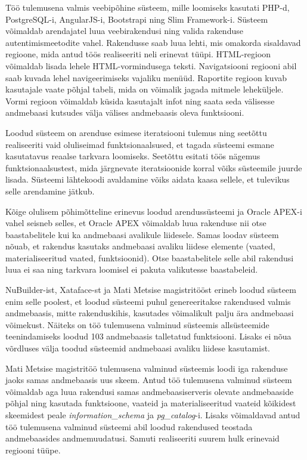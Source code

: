 \documentclass[a4paper,12pt]{article} %
\begin{document}
Töö tulemusena valmis veebipõhine süsteem, mille loomiseks kasutati PHP-d, PostgreSQL-i, AngularJS-i, Bootstrapi ning Slim Framework-i. Süsteem võimaldab arendajatel luua veebirakendusi ning valida rakenduse autentimismeetodite vahel. Rakendusse saab luua lehti, mis omakorda sisaldavad regioone, mida antud töös realiseeriti neli erinevat tüüpi. HTML-regioon võimaldab lisada lehele HTML-vormindusega teksti. Navigatsiooni regiooni abil saab kuvada lehel navigeerimiseks vajaliku menüüd. Raportite regioon kuvab kasutajale vaate põhjal tabeli, mida on võimalik jagada mitmele leheküljele. Vormi regioon võimaldab küsida kasutajalt infot ning saata seda välisesse andmebaasi kutsudes välja välises andmebaasis oleva funktsiooni.\par

Loodud süsteem on arenduse esimese iteratsiooni tulemus ning seetõttu realiseeriti vaid oluliseimad funktsionaalsused, et tagada süsteemi esmane kasutatavus reaalse tarkvara loomiseks. Seetõttu esitati töös nägemus funktsionaalsustest, mida järgnevate iteratsioonide korral võiks süsteemile juurde lisada. Süsteemi lähtekoodi avaldamine võiks aidata kaasa sellele, et tulevikus selle arendamine jätkub.\par

Kõige olulisem põhimõtteline erinevus loodud arendussüsteemi ja Oracle APEX-i vahel seisneb selles, et Oracle APEX võimaldab luua rakenduse nii otse baastabelitele kui ka andmebaasi avalikule liidesele. Samas loodav süsteem nõuab, et rakendus kasutaks andmebaasi avaliku liidese elemente (vaated, materialiseeritud vaated, funktsioonid). Otse baastabelitele selle abil rakendusi luua ei saa ning tarkvara loomisel ei pakuta valikutesse baastabeleid.
\par
NuBuilder-ist, Xataface-st ja Mati Metsise magistritööst erineb loodud süsteem enim selle poolest, et loodud süsteemi puhul genereeritakse rakendused valmis andmebaasis, mitte rakenduskihis, kasutades võimalikult palju ära andmebaasi võimekust. Näiteks on töö tulemusena valminud süsteemis allsüsteemide teenindamiseks loodud 103 andmebaasis talletatud funktsiooni. Lisaks ei  nõua võrdluses välja toodud süsteemid andmebaasi avaliku liidese kasutamist.
\par
Mati Metsise magistritöö tulemusena valminud süsteemis loodi iga rakenduse jaoks samas andmebaasis uus skeem. Antud töö tulemusena valminud süsteem võimaldab aga luua rakendusi samas andmebaasiserveris olevate andmebaaside põhjal ning kasutada funktsioone, vaateid ja materialiseeritud vaateid kõikidest skeemidest peale \textit{information\_schema} ja \textit{pg\_catalog}-i.
Lisaks võimaldavad antud töö tulemusena valminud süsteemi abil loodud rakendused teostada andmebaasides andmemuudatusi. Samuti realiseeriti suurem hulk erinevaid regiooni tüüpe.
\par
\end{document}
